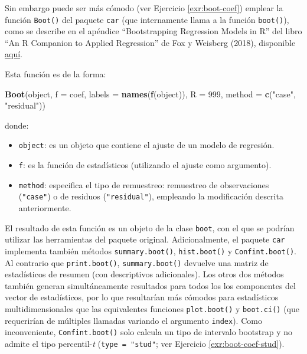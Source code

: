 \documentclass[
]{book}
\newenvironment{Shaded}{\begin{snugshade}}{\end{snugshade}}
\newcommand{\AttributeTok}[1]{\textcolor[rgb]{0.13,0.29,0.53}{#1}}
\newcommand{\DecValTok}[1]{\textcolor[rgb]{0.00,0.00,0.81}{#1}}
\newcommand{\FunctionTok}[1]{\textcolor[rgb]{0.13,0.29,0.53}{\textbf{#1}}}
\newcommand{\NormalTok}[1]{#1}
\newcommand{\StringTok}[1]{\textcolor[rgb]{0.31,0.60,0.02}{#1}}
\theoremstyle{break}
\theoremstyle{nonumberplain}
\begin{document}
Sin embargo puede ser más cómodo (ver Ejercicio \ref{exr:boot-coef}) emplear la función \texttt{Boot()} del paquete \texttt{car} (que internamente llama a la función \texttt{boot()}),
como se describe en el apéndice ``Bootstrapping Regression Models in R'' del libro ``An R Companion to Applied Regression'' de Fox y Weisberg (2018), disponible \href{https://www.john-fox.ca/Companion/appendices.html}{aquí}.

Esta función es de la forma:

\begin{Shaded}
\begin{Highlighting}[]
\FunctionTok{Boot}\NormalTok{(object, }\AttributeTok{f =}\NormalTok{ coef, }\AttributeTok{labels =} \FunctionTok{names}\NormalTok{(}\FunctionTok{f}\NormalTok{(object)), }\AttributeTok{R =} \DecValTok{999}\NormalTok{, }
     \AttributeTok{method =} \FunctionTok{c}\NormalTok{(}\StringTok{"case"}\NormalTok{, }\StringTok{"residual"}\NormalTok{))}
\end{Highlighting}
\end{Shaded}

donde:

\begin{itemize}
\item
  \texttt{object}: es un objeto que contiene el ajuste de un modelo de regresión.
\item
  \texttt{f}: es la función de estadísticos (utilizando el ajuste como argumento).
\item
  \texttt{method}: especifica el tipo de remuestreo: remuestreo de observaciones (\texttt{"case"})
  o de residuos (\texttt{"residual"}), empleando la modificación descrita anteriormente.
\end{itemize}

El resultado de esta función es un objeto de la clase \texttt{boot}, con el que se podrían utilizar las herramientas del paquete original.
Adicionalmente, el paquete \texttt{car} implementa también métodos \texttt{summary.boot()}, \texttt{hist.boot()} y \texttt{Confint.boot()}.
Al contrario que \texttt{print.boot()}, \texttt{summary.boot()} devuelve una matriz de estadísticos de resumen (con descriptivos adicionales).
Los otros dos métodos también generan simultáneamente resultados para todos los los componentes del vector de estadísticos, por lo que resultarían más cómodos para estadísticos multidimensionales que las equivalentes funciones \texttt{plot.boot()} y \texttt{boot.ci()} (que requerirían de múltiples llamadas variando el argumento \texttt{index}).
Como inconveniente, \texttt{Confint.boot()} solo calcula un tipo de intervalo bootstrap y no admite el tipo percentil-\emph{t} (\texttt{type\ =\ "stud"}; ver Ejercicio \ref{exr:boot-coef-stud}).
\end{document}
